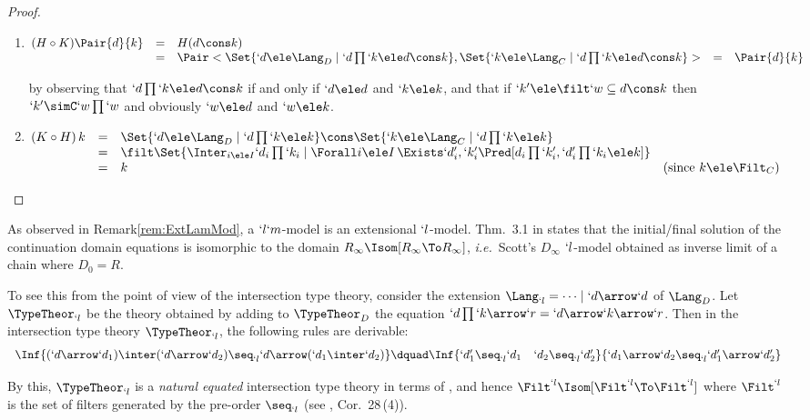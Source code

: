 \documentclass{lmcs}
\def\ie{\emph{i.e.}}
\begin{document}
\begin{proof}
\begin{enumerate}
 \item
 $ \begin{array}[t]{@{}lllll}
	(H \circ K) \Pair{d }{ k } & = & H (d\cons k) \\ 
	& = & \Pair< \Set{`d \ele \Lang_D \mid `d\prod `k \ele d\cons k } , \Set{`k \ele \Lang_C \mid `d\prod `k \ele d\cons k } > %
	& = & \Pair{d }{ k }
 \end{array} $

\noindent
by observing that $`d\prod `k \ele d\cons k$ if and only if $`d \ele d$ and $`k \ele k$, and that if $`k' \ele \filt`w \subseteq d\cons k$ then $`k' \simC `w\prod `w$ and obviously $`w \ele d$ and $`w \ele k$.

 \item
 $ \begin{array}[t]{@{}llll}
	(K \circ H)\, k & = &
	\Set{`d \ele \Lang_D \mid `d\prod `k \ele k } \cons \Set{`k \ele \Lang_C \mid `d\prod `k \ele k } \\ 
	& = & \filt \Set{\Inter_{i \ele I}`d_i\prod `k_i \mid \Forall i \ele I \, \Exists `d'_i, `k'_i \Pred [ d_i\prod `k'_i, `d'_i\prod `k_i \ele k ] } \\
	& = & k & (\textrm{since }k \ele \Filt_C )
 \end{array} $
\arrayqed
 \end{enumerate}
 \end{proof}


 \begin{rem} \label{rem:naturalEquated}
As observed in Remark\skp\ref{rem:ExtLamMod}, a $`l`m$-model is an extensional $`l$-model. 
Thm.~3.1 in \cite{Streicher-Reus'98} states that the initial/final solution of the continuation domain equations is isomorphic to the domain $R_ \infty \Isom [R_ \infty\To R_\infty]$, \ie~Scott's $D_\infty$ $`l$-model obtained as inverse limit of a chain where $D_0 = R$.

To see this from the point of view of the intersection type theory, consider the extension $\Lang_{`l} = \dots \mid `d\arrow `d $ of $\Lang_{D }$. Let $ \TypeTheor_{`l}$ be the theory obtained by adding to $ \TypeTheor_D$ the equation $ `d\prod `k\arrow `r = `d\arrow `k\arrow `r $.
Then in the intersection type theory $ \TypeTheor_{`l}$, the following rules are derivable:
%
 \[ \begin{array}{c@{\dquad}c}
\Inf	{(`d\arrow `d_1) \inter (`d\arrow `d_2) \seq_{`l} `d\arrow(`d_1 \inter`d_2) }
&
\Inf	{`d'_1 \seq_{`l} `d_1 \quad `d_2 \seq_{`l} `d'_2
	}{ `d_1\arrow `d_2 \seq_{`l} `d'_1\arrow `d'_2 }
 \end{array} \]
 
By this, $ \TypeTheor_{`l}$ is a \emph{natural equated} intersection type theory in terms of \cite{Alessi-Severi'08},
and hence $ \Filt^{`l} \Isom [ \Filt^{`l}\To\Filt^{`l}]$ where $ \Filt^{`l}$ is the set of filters generated by the pre-order $\seq_{`l}$ (see \cite{Alessi-Severi'08}, Cor.~28\,(4)). 
 \end{rem}
\end{document}
